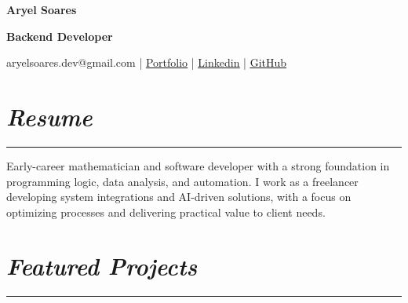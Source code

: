 \documentclass[11pt,a4paper]{article}
\newcommand{\customsection}[1]{
    \section*{{{\textbf{\textit{#1}}}}}

    \vspace{-2em}
    \rule{\textwidth}{0.4pt}

}
\begin{document}
\pagestyle{empty}

\centerline{\textbf{\Huge Aryel Soares}}

\bigskip

\centerline{\textbf{\Large Backend Developer}}

\bigskip

\centerline{\faEnvelope \hspace{0.1cm} {aryelsoares.dev@gmail.com} | \faGlobe \hspace{0.1cm} \href{https://aryelsoares.vercel.app}{\underline{Portfolio}} | \faLinkedin \hspace{0.1cm} \href{https://www.linkedin.com/in/aryelsoares}{\underline{Linkedin}} | \faGithub \hspace{0.1cm} \href{https://github.com/aryelsoares}{\underline{GitHub}}}\vspace{0.3em}

\customsection{Resume}

\vspace{1.5em}

Early-career mathematician and software developer with a strong foundation in programming logic, data analysis, and automation. I work as a freelancer developing system integrations and AI-driven solutions, with a focus on optimizing processes and delivering practical value to client needs.



\customsection{Featured Projects}
\end{document}
